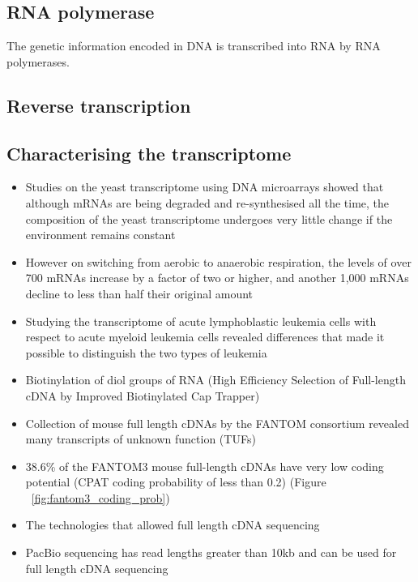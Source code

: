 \subsection{RNA polymerase}

The genetic information encoded in DNA is transcribed into RNA by RNA polymerases.

\subsection{Reverse transcription}

\subsection{Characterising the transcriptome}

\begin{itemize}

   \item Studies on the yeast transcriptome using DNA microarrays showed that although mRNAs are being degraded and re-synthesised all the time, the composition of the yeast transcriptome undergoes very little change if the environment remains constant
   \item However on switching from aerobic to anaerobic respiration, the levels of over 700 mRNAs increase by a factor of two or higher, and another 1,000 mRNAs decline to less than half their original amount
   \item Studying the transcriptome of acute lymphoblastic leukemia cells with respect to acute myeloid leukemia cells revealed differences that made it possible to distinguish the two types of leukemia
   \item Biotinylation of diol groups of RNA (High Efficiency Selection of Full-length cDNA by Improved Biotinylated Cap Trapper) \cite{pmid8938445}
   \item Collection of mouse full length cDNAs by the FANTOM consortium revealed many transcripts of unknown function (TUFs)
   \item 38.6\% of the FANTOM3 mouse full-length cDNAs have very low coding potential (CPAT coding probability of less than 0.2) (Figure ~\ref{fig:fantom3_coding_prob})
   \item The technologies that allowed full length cDNA sequencing
   \item PacBio sequencing has read lengths greater than 10kb and can be used for full length cDNA sequencing

\end{itemize}

